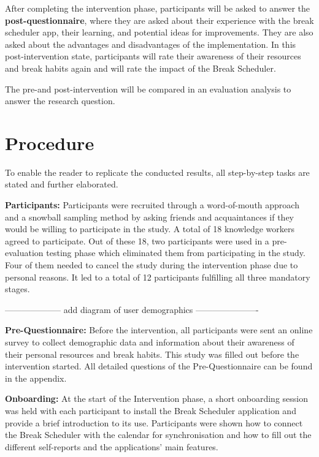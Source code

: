 \documentclass{hasel_thesis}
\begin{document}
After completing the intervention phase, participants will be asked to answer the \textbf{post-questionnaire}, where they are asked about their experience with the break scheduler app, their learning, and potential ideas for improvements. They are also asked about the advantages and disadvantages of the implementation. In this post-intervention state, participants will rate their awareness of their resources and break habits again and will rate the impact of the Break Scheduler.

The pre-and post-intervention will be compared in an evaluation analysis to answer the research question.


\section{Procedure}

To enable the reader to replicate the conducted results, all step-by-step tasks are stated and further elaborated.

\textbf{Participants:} Participants were recruited through a word-of-mouth approach and a snowball sampling method by asking friends and acquaintances if they would be willing to participate in the study. A total of 18 knowledge workers agreed to participate. Out of these 18, two participants were used in a pre-evaluation testing phase which eliminated them from participating in the study. Four of them needed to cancel the study during the intervention phase due to personal reasons. It led to a total of 12 participants fulfilling all three mandatory stages.

-------------------- add diagram of user demographics ----------------------

\textbf{Pre-Questionnaire:} Before the intervention, all participants were sent an online survey to collect demographic data and information about their awareness of their personal resources and break habits. This study was filled out before the intervention started. All detailed questions of the Pre-Questionnaire can be found in the appendix.

\textbf{Onboarding:} At the start of the Intervention phase, a short onboarding session was held with each participant to install the Break Scheduler application and provide a brief introduction to its use. Participants were shown how to connect the Break Scheduler with the calendar for synchronisation and how to fill out the different self-reports and the applications' main features.
\end{document}
